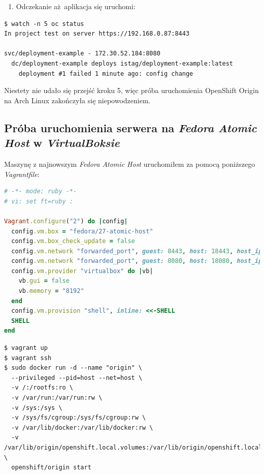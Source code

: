 \documentclass[a4paper,12pt,twoside,openany]{report}
\providecommand{\tightlist}{%
  \setlength{\itemsep}{0pt}\setlength{\parskip}{0pt}}
\begin{document}
\begin{enumerate}
\def\labelenumi{\arabic{enumi}.}
\setcounter{enumi}{5}
\tightlist
\item
  Odczekanie aż~aplikacja się uruchomi:
\end{enumerate}

\begin{lstlisting}
$ watch -n 5 oc status
In project test on server https://192.168.0.87:8443

svc/deployment-example - 172.30.52.184:8080
  dc/deployment-example deploys istag/deployment-example:latest 
    deployment #1 failed 1 minute ago: config change
\end{lstlisting}

Niestety nie udało się przejść kroku 5, więc próba uruchomienia
OpenShift Origin na Arch Linux zakończyła się niepowodzeniem.

\hypertarget{pruxf3ba-uruchomienia-serwera-na-fedora-atomic-host-w-virtualboksie}{%
\subsection{\texorpdfstring{Próba uruchomienia serwera na \emph{Fedora
Atomic Host} w
\emph{VirtualBoksie}}{Próba uruchomienia serwera na Fedora Atomic Host w VirtualBoksie}}\label{pruxf3ba-uruchomienia-serwera-na-fedora-atomic-host-w-virtualboksie}}

Maszynę z najnowszym \emph{Fedora Atomic Host} uruchomiłem za pomocą
poniższego \emph{Vagrantfile}:

\begin{lstlisting}[language=Ruby]
# -*- mode: ruby -*-
# vi: set ft=ruby :

Vagrant.configure("2") do |config|
  config.vm.box = "fedora/27-atomic-host"
  config.vm.box_check_update = false
  config.vm.network "forwarded_port", guest: 8443, host: 18443, host_ip: "127.0.0.1"
  config.vm.network "forwarded_port", guest: 8080, host: 18080, host_ip: "127.0.0.1"
  config.vm.provider "virtualbox" do |vb|
    vb.gui = false
    vb.memory = "8192"
  end
  config.vm.provision "shell", inline: <<-SHELL
  SHELL
end
\end{lstlisting}

\begin{lstlisting}
$ vagrant up
$ vagrant ssh
$ sudo docker run -d --name "origin" \
  --privileged --pid=host --net=host \
  -v /:/rootfs:ro \
  -v /var/run:/var/run:rw \
  -v /sys:/sys \
  -v /sys/fs/cgroup:/sys/fs/cgroup:rw \
  -v /var/lib/docker:/var/lib/docker:rw \
  -v /var/lib/origin/openshift.local.volumes:/var/lib/origin/openshift.local.volumes:rslave \
  openshift/origin start
\end{lstlisting}
\end{document}
